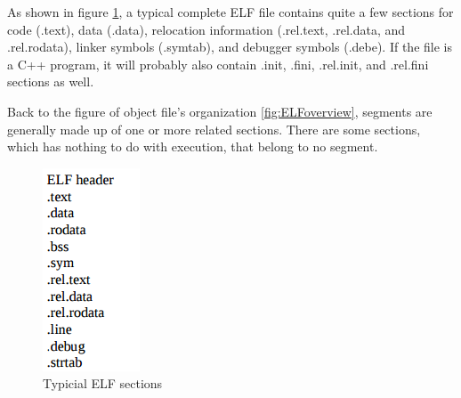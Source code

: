             As shown in figure \ref{fig:ELFsections}, a typical complete ELF file contains quite a few sections for code (.text), data (.data), relocation information (.rel.text, .rel.data, and .rel.rodata), linker symbols (.symtab), and debugger symbols (.debe)\cite{LAL-00}. If the file is a C++ program, it will probably also contain .init, .fini, .rel.init, and .rel.fini sections as well\cite{LAL-00}. 
            
            Back to the figure of object file's organization \ref{fig:ELFoverview}, segments are generally made up of one or more related sections. There are some sections, which has nothing to do with execution, that belong to no segment. 
            
            
              \begin{figure}[H]
                \centering
                \includegraphics[scale = 0.6]
                {Images/concepts/ELFsections.png}
                \caption[Typicial ELF sections]%
                {Typicial ELF sections\cite{LAL-00}}    
                \label{fig:ELFsections}
            \end{figure}
           
        
            
